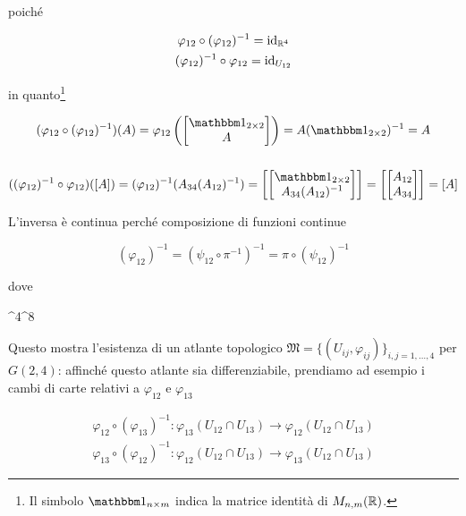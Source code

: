 poiché

\begin{gather}
	\varphi_{12} \circ (\varphi_{12})^{-1} = \operatorname{id}_{\mathbb{R}^{4}} \\
	(\varphi_{12})^{-1} \circ \varphi_{12} = \operatorname{id}_{U_{12}}
\end{gather}

in quanto\footnote{%
	Il simbolo $ \bigone_{n \times m} $ indica la matrice identità di $ M_{n,m}(\mathbb{R}) $.%
}

\begin{gather}
	(\varphi_{12} \circ (\varphi_{12})^{-1})(A) = \varphi_{12} \left( \bmqty{ \bigone_{2 \times 2} \\ A } \right) = A (\bigone_{2 \times 2})^{-1} = A \\ \\
	((\varphi_{12})^{-1} \circ \varphi_{12})([A]) = (\varphi_{12})^{-1}(A_{34} (A_{12})^{-1}) = \left[ \bmqty{ \bigone_{2 \times 2} \\ A_{34} (A_{12})^{-1} } \right] = \left[ \bmqty{ A_{12} \\ A_{34} } \right] = [A]
\end{gather}

L'inversa è continua perché composizione di funzioni continue

\begin{equation}
	(\varphi_{12})^{-1} = (\psi_{12} \circ \pi^{-1})^{-1} = \pi \circ (\psi_{12})^{-1}
\end{equation}

dove

	{\R^{4}}{\R^{8}}
	{}{}

Questo mostra l'esistenza di un atlante topologico $ \mathfrak{M} = \{(U_{ij},\varphi_{ij})\}_{i,j=1,\dots,4} $ per $ G(2,4) $: affinché questo atlante sia differenziabile, prendiamo ad esempio i cambi di carte relativi a $ \varphi_{12} $ e $ \varphi_{13} $

\begin{gather}
	\varphi_{12} \circ (\varphi_{13})^{-1} : \varphi_{13} (U_{12} \cap U_{13}) \to \varphi_{12} (U_{12} \cap U_{13}) \\
	\varphi_{13} \circ (\varphi_{12})^{-1} : \varphi_{12} (U_{12} \cap U_{13}) \to \varphi_{13} (U_{12} \cap U_{13})
\end{gather}

